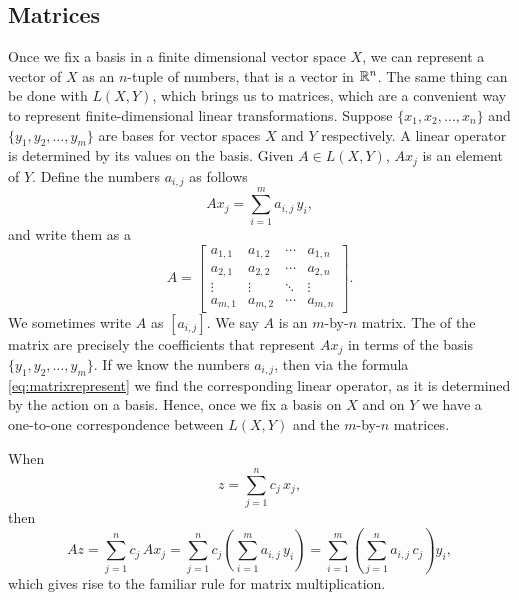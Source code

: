 \subsection{Matrices}

Once we fix a basis in a finite dimensional
vector space $X$, we can represent a vector of $X$ as an $n$-tuple of
numbers, that is a vector in ${\mathbb{R}}^n$.  The same thing
can be done with $L(X,Y)$, which brings us to matrices,
which are a convenient way to represent
finite-dimensional linear transformations.
Suppose $\{ x_1, x_2, \ldots, x_n \}$ and $\{ y_1, y_2, \ldots, y_m \}$
are bases for vector spaces $X$ and $Y$ respectively.  A linear operator is 
determined by its values on the basis.  Given $A \in L(X,Y)$,
$A x_j$ is an element of $Y$.  Define the numbers
$a_{i,j}$ as follows
\begin{equation} \label{eq:matrixrepresent}
A x_j = \sum_{i=1}^m a_{i,j} \, y_i ,
\end{equation}
and write them as a \emph{}
\begin{equation*}
A =
\begin{bmatrix}
a_{1,1} & a_{1,2} & \cdots & a_{1,n} \\
a_{2,1} & a_{2,2} & \cdots & a_{2,n} \\
\vdots & \vdots & \ddots & \vdots \\
a_{m,1} & a_{m,2} & \cdots & a_{m,n}
\end{bmatrix} .
\end{equation*}
We sometimes write $A$ as $[a_{i,j}]$.
We say $A$ is an $m$-by-$n$ matrix.
The \emph{} of the matrix are precisely the coefficients
that represent $A x_j$ in terms of the basis $\{ y_1,y_2,\ldots,y_m \}$.
If we know the numbers $a_{i,j}$, then via the formula
\eqref{eq:matrixrepresent} we find the corresponding linear operator,
as it is determined by the action on a basis.  Hence, once we fix
a basis on $X$ and on $Y$ we have a one-to-one correspondence between
$L(X,Y)$ and the $m$-by-$n$ matrices.

When
\begin{equation*}
z = \sum_{j=1}^n c_j \, x_j ,
\end{equation*}
then
\begin{equation*}
A z =
\sum_{j=1}^n c_j \, A x_j 
=
\sum_{j=1}^n c_j \left( \sum_{i=1}^m  a_{i,j}\, y_i \right) 
=
\sum_{i=1}^m \left(\sum_{j=1}^n  a_{i,j}\, c_j \right) y_i ,
\end{equation*}
which gives rise to the familiar rule for matrix multiplication.

